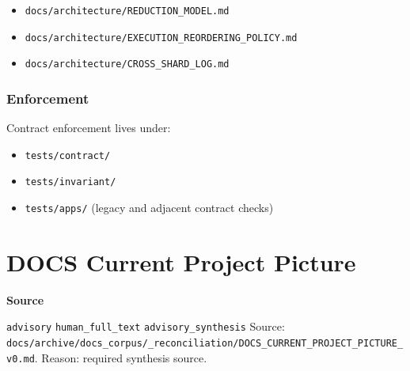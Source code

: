 \documentclass[9pt,a4paper,openany]{book}
\newcommand{\vonecallout}[3]{\par\medskip\noindent\begingroup\setlength{\fboxsep}{7pt}\colorbox{DomCalloutBg}{\parbox{0.94\linewidth}{\textbf{\textcolor{#1}{#2}}\par #3}}\endgroup\par\medskip}
\begin{document}
\begin{itemize}
\item \texttt{docs/\allowbreak{}architecture/\allowbreak{}REDUCTION\_\allowbreak{}MODEL.\allowbreak{}md}
\end{itemize}

\begin{itemize}
\item \texttt{docs/\allowbreak{}architecture/\allowbreak{}EXECUTION\_\allowbreak{}REORDERING\_\allowbreak{}POLICY.\allowbreak{}md}
\end{itemize}


\begin{itemize}
\item \texttt{docs/\allowbreak{}architecture/\allowbreak{}CROSS\_\allowbreak{}SHARD\_\allowbreak{}LOG.\allowbreak{}md}
\end{itemize}





\subsubsection{Enforcement}


Contract enforcement lives under:



\begin{itemize}
\item \texttt{tests/\allowbreak{}contract/\allowbreak{}}
\item \texttt{tests/\allowbreak{}invariant/\allowbreak{}}
\end{itemize}


\begin{itemize}
\item \texttt{tests/\allowbreak{}apps/\allowbreak{}} (legacy and adjacent contract checks)
\end{itemize}



\section{DOCS Current Project Picture}

\vonecallout{DomSlate}{Source}{\texttt{advisory} \texttt{human\_\allowbreak{}full\_\allowbreak{}text} \texttt{advisory\_\allowbreak{}synthesis} Source: \texttt{docs/\allowbreak{}archive/\allowbreak{}docs\_\allowbreak{}corpus/\allowbreak{}\_\allowbreak{}reconciliation/\allowbreak{}DOCS\_\allowbreak{}CURRENT\_\allowbreak{}PROJECT\_\allowbreak{}PICTURE\_\allowbreak{}v0.\allowbreak{}md}.\allowbreak{} Reason: required synthesis source.\allowbreak{}}
\end{document}
